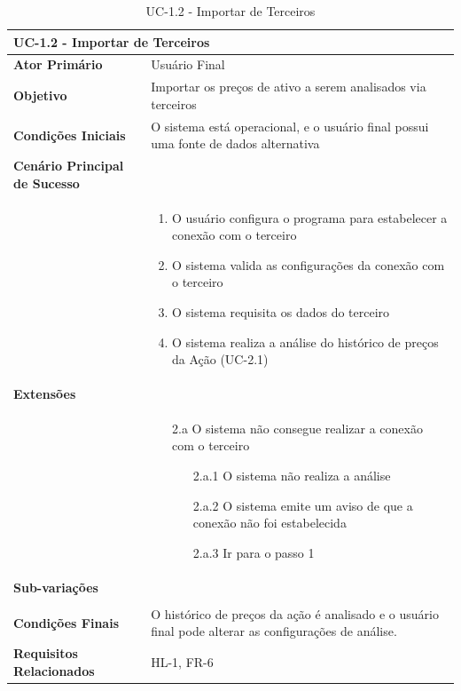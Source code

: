 \documentclass[12pt]{article}
\begin{document}
\begin{table}[H]
	\caption{UC-1.2 - Importar de Terceiros}
	\label{tab:ImportFromThirdParty}
	\begin{tabular}{p{6cm} p{8cm}}
		\multicolumn{2}{l}{\large{\textbf{UC-1.2 - Importar de Terceiros}}}\\
		\toprule
		\textbf{Ator Primário}		&	Usuário Final \\
		\midrule
		\textbf{Objetivo}			&	Importar os preços de ativo a serem analisados via terceiros\\
		\midrule
		\textbf{Condições Iniciais}	&	O sistema está operacional, e o usuário final possui
										uma fonte de dados alternativa \\
		\midrule
		\textbf{Cenário Principal de Sucesso}	& \\
		& \begin{enumerate}
			\item O usuário configura o programa  para estabelecer a conexão com o terceiro
			\item O sistema valida as configurações da conexão com o terceiro
			\item O sistema requisita os dados do terceiro
			\item O sistema realiza a análise do histórico de preços da Ação (UC-2.1)
		\end{enumerate}\\
		\midrule
		\textbf{Extensões}	& \\
		& \begin{enumerate}
			\item[2.a] O sistema não consegue realizar a conexão com o terceiro
			\begin{enumerate}
				\item[2.a.1] O sistema não realiza a análise
				\item[2.a.2] O sistema emite um aviso de que a conexão não foi estabelecida
				\item[2.a.3] Ir para o passo 1 
			\end{enumerate}
		\end{enumerate}\\
		\midrule
		\textbf{Sub-variações} & \\
		& \\
		\midrule
		\textbf{Condições Finais} & O histórico de preços da ação é analisado e o usuário final
									pode alterar as configurações de análise. \\
		\midrule
		\textbf{Requisitos Relacionados} & HL-1, FR-6 \\
		\bottomrule
	\end{tabular}		
\end{table}
\end{document}
